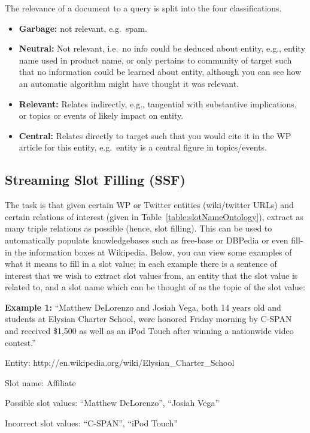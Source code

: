 The relevance of a document to a query is split into the four classifications.
\begin{itemize}[noitemsep]
  \item \textbf{Garbage:} not relevant, e.g.\ spam.
  \item \textbf{Neutral:} Not relevant, i.e.\ no info could be deduced about entity, 
    e.g., entity name used in product name, or only pertains to community of target 
    such that no information could be learned about entity, although you can see how 
    an automatic algorithm might have thought it was relevant.
  \item \textbf{Relevant:} Relates indirectly, e.g., tangential with substantive 
    implications, or topics or events of likely
    impact on entity.
  \item \textbf{Central:} Relates directly to target such that you would cite it in 
    the WP article for this entity, e.g.\ entity is a
    central figure in topics/events.
\end{itemize}


\subsection{Streaming Slot Filling (SSF)}
The task is that given certain WP or Twitter entities (wiki/twitter URLs) and certain relations of interest (given in Table~\ref{table:slotNameOntology}), extract as many triple relations as possible (hence, slot filling). This can be used to automatically populate knowledgebases such as free-base or DBPedia or even fill-in the information boxes at Wikipedia. Below, you can view some examples of what it means to fill in a slot value; in each example there is a sentence of interest that we wish to extract slot values from, an entity that the slot value is related to, and a slot name which can be thought of as the topic of the slot value:

\noindent \textbf{Example 1:} ``Matthew DeLorenzo and Josiah Vega, both 14 years old and students at Elysian Charter School, were honored Friday morning by C-SPAN and received \$1,500 as well as an iPod Touch after winning a nationwide video contest.''

Entity:  http://en.wikipedia.org/wiki/Elysian\_Charter\_School

Slot name: Affiliate

Possible slot values: ``Matthew DeLorenzo'', ``Josiah Vega''

Incorrect slot values: ``C-SPAN'', ``iPod Touch''

